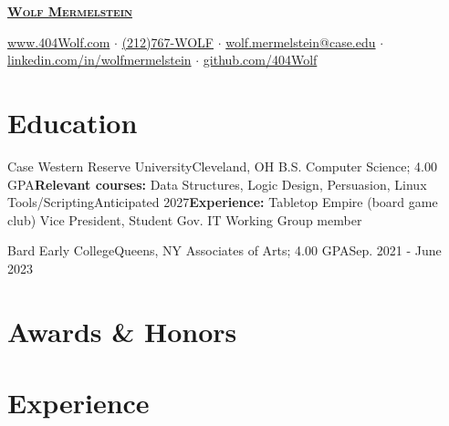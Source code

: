 \documentclass[letterpaper, 10pt]{article}
\begin{document}


\begin{center}
	\textbf{\Huge \scshape \href{https://404wolf.com}{Wolf Mermelstein}} \\ \vspace{4pt}

	\href{https://404wolf.com}{www.404Wolf.com}
	$\cdot$
	\small \href{tel:(+12127679653)}{(212)767-WOLF}
	$\cdot$
	\href{mailto:wolf.mermelstein@case.edu}{wolf.mermelstein@case.edu}
	$\cdot$
	\href{https://linkedin.com/in/wolfmermelstein}{linkedin.com/in/wolfmermelstein}
	$\cdot$
	\href{https://github.com/404wolf}{github.com/404Wolf}
\end{center}
\vspace{-18px}

\section{Education}
\resumeSubHeadingListStart
\resumeSubheading
{Case Western Reserve University}{Cleveland, OH}
{B.S. Computer Science; 4.00 GPA}{\textbf{Relevant courses:} Data Structures, Logic Design, Persuasion, Linux Tools/Scripting}{Anticipated 2027}{\textbf{Experience:} Tabletop Empire (board game club) Vice President, Student Gov. IT Working Group member}

\resumeSubheading
{Bard Early College}{Queens, NY}{}
{Associates of Arts;  4.00 GPA}{Sep. 2021 - June 2023}{}
\resumeSubHeadingListEnd

\section{Awards \& Honors}
\resumeSubHeadingListStart


\resumeSubHeadingListEnd

\section{Experience}
\resumeSubHeadingListStart
\end{document}
